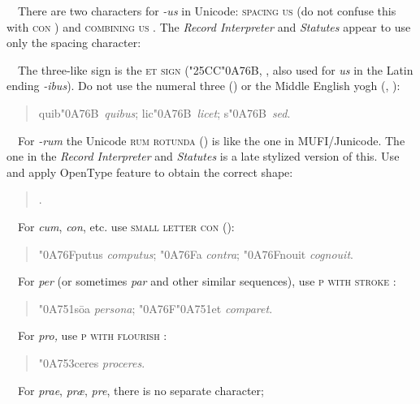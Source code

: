 \noindent{}\ \ There are two characters for \textit{{}-us} in Unicode:
\textsc{spacing us}  (do not
confuse this with \textsc{con} ) and \textsc{combining us} . The \textit{Record
Interpreter} and \textit{Statutes} appear to use only the spacing character:
\begin{quote}
\end{quote}
\noindent{}\ \ The three-like sign is the \textsc{et sign} (\char"25CC\char"0A76B, , also used for
\textit{us} in the Latin ending \textit{-ibus}). Do not use the numeral three ()
or the Middle English yogh (, ):
\begin{quote}
quib\char"0A76B\ \textit{quibus}; lic\char"0A76B\ \textit{licet}; s\char"0A76B\ \textit{sed}.
\end{quote}
\noindent{}\ \ For \textit{{}-rum} the Unicode \textsc{rum rotunda} () is like the one in MUFI/Junicode.
The one in the \textit{Record Interpreter} and \textit{Statutes} is a late stylized version of
this. Use  and apply OpenType feature \textsc{} to obtain the correct shape:
\begin{quote}
.
\end{quote}
\noindent{}\ \ For \textit{cum}, \textit{con}, etc. use \textsc{small letter con} ():
\begin{quote}
\char"0A76Fputus \textit{computus}; \char"0A76Fa \textit{contra}; \char"0A76Fnouit \textit{cognouit}.
\end{quote}
\noindent{}\ \ For \textit{per} (or sometimes \textit{par} and other similar sequences), use
\textsc{p with stroke} \unic{U+A751}:
\begin{quote}
\char"0A751s\={o}a \textit{persona}; \char"0A76F\char"0A751et \textit{comparet}.
\end{quote}
\noindent{}\ \  For \textit{pro,} use \textsc{p with flourish} :
\begin{quote}
\char"0A753ceres \textit{proceres}.
\end{quote}
\noindent{}\ \ For \textit{prae}, \textit{pr{\ae}}, \textit{pre}, there is no separate character;
